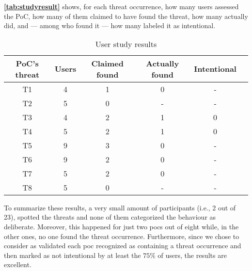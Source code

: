\textbf{\autoref{tab:studyresult}} shows, for each threat occurrence, how many users assessed the PoC, how many of them claimed to have found the threat, how many actually did, and --- among who found it --- how many labeled it as intentional. 


\begin{table}[h!]
    \centering
    \begin{tabular}{| c | c | c | c | c | c |}
    \hline
    \textbf{PoC's threat} & \textbf{Users} & \textbf{Claimed found} & \textbf{Actually found} & \textbf{Intentional} \\
    \hline
    T1 & 4 & 1 & 0  & - \\
    \hline
    T2 & 5 & 0 & - & - \\
    \hline
    T3 & 4 & 2 & 1  & 0 \\
    \hline
    T4 & 5 & 2 & 1 & 0 \\
    \hline
    T5 & 9 & 3 & 0 & - \\
    \hline
    T6 & 9 & 2 & 0 & - \\
    \hline
    T7 & 5 & 2 & 0 & - \\
    \hline
    T8 & 5 & 0 & - & - \\
    \hline
    \end{tabular}
    \caption{User study results}
    \label{tab:studyresult}
\end{table}

To summarize these results, a very small amount of participants (i.e., 2 out of 23), spotted the threats and none of them categorized the behaviour as deliberate. Moreover, this happened for just two \glspl{poc} out of eight while, in the other ones, no one found the threat occurrence. Furthermore, since we chose to consider as validated each \gls{poc} recognized as containing a threat occurrence and then marked as not intentional by at least the $75\%$ of users, the results are excellent.  
\\

